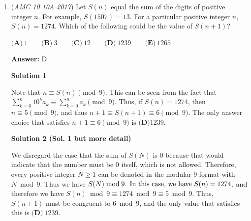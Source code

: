 \begin{enumerate}
 Case 3: Alice sits in the middle seatOnce again, Derek and Eric must be on both sides of Alice, and Bob and Carla need to take the two remaining seats. There are also $4$ ways to permute and $4$ arrangements here.

 Case 4: Alice sits in the fourth seatBy symmetry, this is the same as case 2. There are $4$ arrangements.

 Case 5: Alice sits in the last seat (rightmost)By symmetry, this is the same as case 1. There are $8$ arrangements.

 Adding up the cases, there are $8+4+4+4+8=28$ total seating arrangements $\Longrightarrow \boxed{\textbf{(C) } 28}$

 
P.S. For this question, it is possible and slightly less insanity-inducing to list out every combination and make an educated guess from there, but is not recommended unless you've given up all hope from doing the solutions above this one :P

 


 


	\item (\textit{AMC 10 10A 2017}) Let $S(n)$ equal the sum of the digits of positive integer $n$. For example, $S(1507) = 13$. For a particular positive integer $n$, $S(n) = 1274$. Which of the following could be the value of $S(n+1)$?


 $\textbf{(A)}\ 1 \qquad\textbf{(B)}\ 3\qquad\textbf{(C)}\ 12\qquad\textbf{(D)}\ 1239\qquad\textbf{(E)}\ 1265$

 \textbf{Answer: }D



\textbf{Solution 1}

Note that $n \equiv S(n) \pmod{9}$. This can be seen from the fact that $\sum_{k=0}^{n}10^{k}a_k \equiv \sum_{k=0}^{n}a_k \pmod{9}$. Thus, if $S(n) = 1274$, then $n \equiv 5 \pmod{9}$, and thus $n+1 \equiv S(n+1) \equiv 6 \pmod{9}$. The only answer choice that satisfies $n+1 \equiv 6 \pmod{9}$ is $\boxed{\textbf{(D)} 1239}$.

 



\textbf{Solution 2 (Sol. 1 but more detail)}

We disregard the case that the sum of $S(N)$ is $0$ because that would indicate that the number must be $0$ itself, which is not allowed. Therefore, every positive integer $N \ge 1$ can be denoted in the modular 9 format with $N \bmod 9$. Thus we have $S(N) \bmod 9 \). In this case, we have \( S(n) = 1274$, and therefore we have $S(n) \bmod 9 \equiv 1274 \bmod 9 \equiv 5 \bmod 9$. Thus, \( S(n+1) \) must be congruent to $6 \bmod 9$, and the only value that satisfies this is $\boxed{\textbf{(D)}\ 1239}$.


\end{enumerate}
